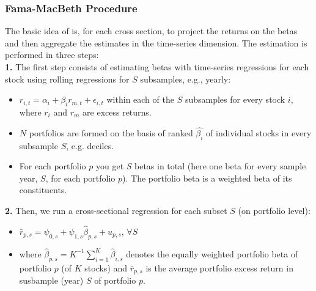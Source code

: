 \documentclass[xcolor=dvipsnames, english, 8pt]{beamer}
\begin{document}
\begin{frame}[label=FMB]
    \frametitle{Fama-MacBeth Procedure}

    The basic idea of \cite{FAMA1973} is, for each cross section, to project the returns on the betas and then aggregate the estimates in the time-series dimension. The estimation is performed in three steps: \vspace{0.5cm}\\
    \textbf{1.} {\color{ubRed} The first step consists of estimating betas with time-series regressions for each stock} using rolling regressions for $S$ subsamples, e.g., yearly:\vspace{0.25cm}\\
    \begin{itemize}
        \item $r_{i,t} = \alpha_i + \beta_i r_{m,t} + \epsilon_{i,t}$ within each of the $S$ subsamples for every stock $i$, where $r_i$ and $r_m$ are excess returns.
        \item $N$ portfolios are formed on the basis of ranked $\hat{\beta_i}$ of individual stocks in every subsample $S$, e.g. deciles.
        \item For each portfolio $p$ you get $S$ betas in total (here one beta for every sample year, $S$, for each portfolio $p$). The portfolio beta is a weighted beta of its constituents. \vspace{0.25cm}\\
    \end{itemize}
\textbf{2.} {\color{ubRed} Then, we run a cross-sectional regression for each subset $S$} (on portfolio level):\vspace{0.25cm}\\
\begin{itemize}
    \item $\bar{r}_{p,s} = \psi_{0,s} + \psi_{1,s}\hat{\beta}_{p,s} + u_{p,s}$, $\forall S$
    \item where $\hat{\beta}_{p,s} = K^{-1} \sum_{i=1}^{K} \hat{\beta}_{i,s}$ denotes the equally weighted portfolio beta of portfolio $p$  (of $K$ stocks) and $\bar{r}_{p,s}$ is the average portfolio excess return in susbample (year) $S$ of portfolio $p$.
\end{itemize}


\end{frame}
\end{document}

